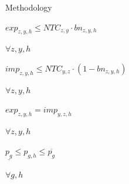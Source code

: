 \documentclass[aspectratio=169]{beamer}
\begin{document}
\begin{frame}{Methodology}
\begin{minipage}[t]{0.78\textwidth}
\begin{coloredblock}[blue][][][c][2.35cm][][0ex][0ex]
\begin{minipage}[t]{.89\textwidth}
                \begin{center}
                    \footnotesize$exp_{z,y,h} \leq NTC_{z,y} \cdot bn_{z,y,h}$
                \end{center}
            \end{minipage}
            \hfill
            \begin{minipage}[t]{.1\textwidth}
                \footnotesize $\forall z,y,h$
            \end{minipage}
        \end{coloredblock}
        \vspace{-0.55cm}
        \begin{coloredblock}[blue][][][c][2.35cm][][0ex][0ex]
            \begin{minipage}[t]{.89\textwidth}
                \begin{center}
                    \footnotesize$imp_{z,y,h} \leq NTC_{y,z} \cdot (1-bn_{z,y,h})$
                \end{center}
            \end{minipage}
            \hfill
            \begin{minipage}[t]{.1\textwidth}
                \footnotesize $\forall z,y,h$
            \end{minipage}
        \end{coloredblock}
        \vspace{-0.55cm}
        \begin{coloredblock}[blue][][][c][2.35cm][][0ex][0ex]
            \begin{minipage}[t]{.89\textwidth}
                \begin{center}
                    \footnotesize$exp_{z,y,h} = imp_{y,z,h}$
                \end{center}
            \end{minipage}
            \hfill
            \begin{minipage}[t]{.1\textwidth}
                \footnotesize $\forall z,y,h$
            \end{minipage}
        \end{coloredblock}
        \vspace{-0.55cm}
        \begin{coloredblock}[blue][][][c][2.35cm][][0ex][0ex]
            \begin{minipage}[t]{.89\textwidth}
                \begin{center}
                    \footnotesize$\underline{p_g} \leq p_{g,h} \leq \overline{p_g}$
                \end{center}
            \end{minipage}
            \hfill
            \begin{minipage}[t]{.1\textwidth}
                \footnotesize $\forall g,h$
            \end{minipage}
        \end{coloredblock}
    \end{minipage}
    
\end{frame}
\end{document}
